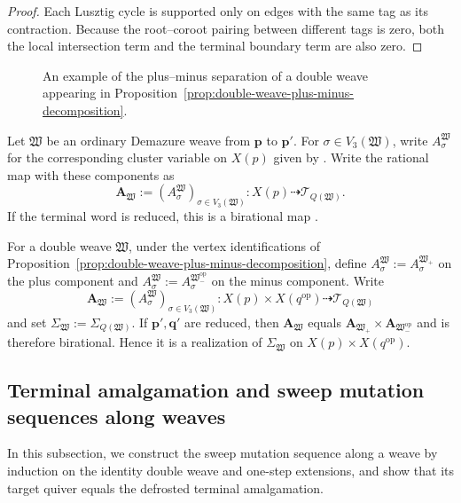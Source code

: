 \documentclass[10pt,a4paper]{article}
\theoremstyle{definition}
\theoremstyle{remark}
\newcommand{\Tcal}{\mathcal T}
\newcommand{\fW}{\mathfrak W}
\begin{document}
\begin{proof}
Each Lusztig cycle is supported only on edges with the same tag as its
contraction.
Because the root--coroot pairing between different tags is zero, both the local
intersection term and the terminal boundary term are also zero.
\end{proof}

\begin{figure}[htbp]
\centering

\caption{An example of the plus--minus separation of a double weave appearing
in Proposition~\ref{prop:double-weave-plus-minus-decomposition}.}
\label{fig:double-weave-plus-minus-separation}
\end{figure}

Let \(\fW\) be an ordinary Demazure weave from \(\mathbf p\) to
\(\mathbf p'\).  For \(\sigma\in V_3(\fW)\), write \(A_\sigma^\fW\) for the
corresponding cluster variable on \(X(p)\) given by
\cite[Theorem~5.12]{CasalsEtAlBraidVarieties}.  Write the rational map with
these components as
\[
 \mathbf A_\fW:=(A_\sigma^\fW)_{\sigma\in V_3(\fW)}:
 X(p)\dashrightarrow\Tcal_{Q(\fW)}.
\]
If the terminal word is reduced, this is a birational map
\cite[Lemma~5.14]{CasalsEtAlBraidVarieties}.

For a double weave \(\fW\), under the vertex identifications of
Proposition~\ref{prop:double-weave-plus-minus-decomposition}, define
\(A_\sigma^\fW:=A_\sigma^{\fW_+}\) on the plus component and
\(A_\sigma^\fW:=A_\sigma^{\fW_-^{\mathrm{op}}}\) on the minus component.
Write
\[
 \mathbf A_\fW
 :=(A_\sigma^\fW)_{\sigma\in V_3(\fW)}:
 X(p)\times X(q^{\mathrm{op}})
 \dashrightarrow\Tcal_{Q(\fW)}
\]
and set \(\Sigma_\fW:=\Sigma_{Q(\fW)}\).  If
\(\mathbf p',\mathbf q'\) are reduced, then \(\mathbf A_\fW\) equals
\(\mathbf A_{\fW_+}\times\mathbf A_{\fW_-^{\mathrm{op}}}\) and is therefore
birational.  Hence it is a realization of \(\Sigma_\fW\) on
\(X(p)\times X(q^{\mathrm{op}})\).

\subsection{Terminal amalgamation and sweep mutation sequences along weaves}
\label{subsec:terminal-amalgamation}

In this subsection, we construct the sweep mutation sequence along a weave by
induction on the identity double weave and one-step extensions, and show that
its target quiver equals the defrosted terminal amalgamation.  
\end{document}

